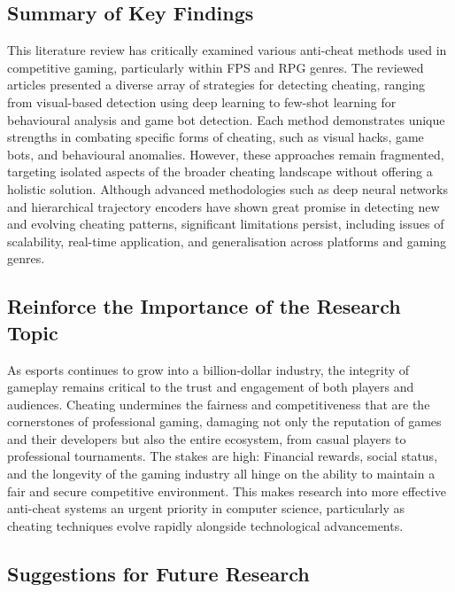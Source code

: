 \documentclass[a4paper, 12pt]{article}
\begin{document}
\subsection{Summary of Key Findings}

This literature review has critically examined various anti-cheat methods used in competitive gaming, particularly within FPS and RPG genres. The reviewed articles presented a diverse array of strategies for detecting cheating, ranging from visual-based detection using deep learning to few-shot learning for behavioural analysis and game bot detection. Each method demonstrates unique strengths in combating specific forms of cheating, such as visual hacks, game bots, and behavioural anomalies. However, these approaches remain fragmented, targeting isolated aspects of the broader cheating landscape without offering a holistic solution. Although advanced methodologies such as deep neural networks and hierarchical trajectory encoders have shown great promise in detecting new and evolving cheating patterns, significant limitations persist, including issues of scalability, real-time application, and generalisation across platforms and gaming genres.

\subsection{Reinforce the Importance of the Research Topic}

As esports continues to grow into a billion-dollar industry, the integrity of gameplay remains critical to the trust and engagement of both players and audiences. Cheating undermines the fairness and competitiveness that are the cornerstones of professional gaming, damaging not only the reputation of games and their developers but also the entire ecosystem, from casual players to professional tournaments. The stakes are high: Financial rewards, social status, and the longevity of the gaming industry all hinge on the ability to maintain a fair and secure competitive environment. This makes research into more effective anti-cheat systems an urgent priority in computer science, particularly as cheating techniques evolve rapidly alongside technological advancements.

\subsection{Suggestions for Future Research}
\end{document}
